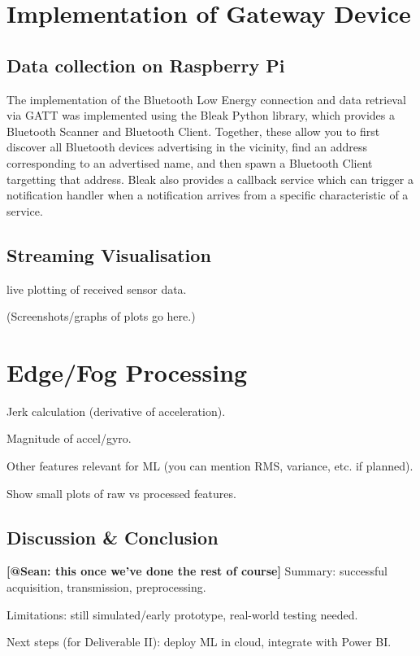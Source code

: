 \documentclass[conference]{IEEEtran}
\begin{document}
\section{Implementation of Gateway Device}
\subsection{Data collection on Raspberry Pi}
The implementation of the Bluetooth Low Energy connection and data retrieval via GATT was implemented using the Bleak Python library, which provides a Bluetooth Scanner and Bluetooth Client. Together, these allow you to first discover all Bluetooth devices advertising in the vicinity, find an address corresponding to an advertised name, and then spawn a Bluetooth Client targetting that address. Bleak also provides a callback service which can trigger a notification handler when a notification arrives from a specific characteristic of a service.

\subsection{Streaming Visualisation}
 live plotting of received sensor data.

(Screenshots/graphs of plots go here.)

\section{Edge/Fog Processing}
Jerk calculation (derivative of acceleration).

Magnitude of accel/gyro.

Other features relevant for ML (you can mention RMS, variance, etc. if planned).

Show small plots of raw vs processed features.


\subsection{Discussion \& Conclusion}
\textbf{[@Sean: this once we've done the rest of course]} 
Summary: successful acquisition, transmission, preprocessing.

Limitations: still simulated/early prototype, real-world testing needed.

Next steps (for Deliverable II): deploy ML in cloud, integrate with Power BI.



\end{document}
